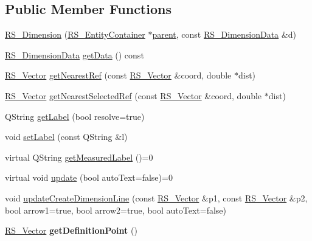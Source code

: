 \subsection*{Public Member Functions}
\begin{DoxyCompactItemize}
\item 
\hyperlink{classRS__Dimension_a2c6f8f5b67a071e52311daaa9a88af64}{R\-S\-\_\-\-Dimension} (\hyperlink{classRS__EntityContainer}{R\-S\-\_\-\-Entity\-Container} $\ast$\hyperlink{classRS__Entity_a80358a8d2fc6739a516a278dc500b49f}{parent}, const \hyperlink{classRS__DimensionData}{R\-S\-\_\-\-Dimension\-Data} \&d)
\item 
\hyperlink{classRS__DimensionData}{R\-S\-\_\-\-Dimension\-Data} \hyperlink{classRS__Dimension_ad8c1379f5581614b6fa2905434bc5859}{get\-Data} () const 
\item 
\hyperlink{classRS__Vector}{R\-S\-\_\-\-Vector} \hyperlink{classRS__Dimension_a85e687eb77484cf9ad27eaf7ab07254b}{get\-Nearest\-Ref} (const \hyperlink{classRS__Vector}{R\-S\-\_\-\-Vector} \&coord, double $\ast$dist)
\item 
\hyperlink{classRS__Vector}{R\-S\-\_\-\-Vector} \hyperlink{classRS__Dimension_a500b8585e0b651e693d9fd47bb86be19}{get\-Nearest\-Selected\-Ref} (const \hyperlink{classRS__Vector}{R\-S\-\_\-\-Vector} \&coord, double $\ast$dist)
\item 
Q\-String \hyperlink{classRS__Dimension_a87c6372241c3a25b83e41db5a55970f5}{get\-Label} (bool resolve=true)
\item 
void \hyperlink{classRS__Dimension_ae2ace5c182377eb10ed92273d00f6f56}{set\-Label} (const Q\-String \&l)
\item 
virtual Q\-String \hyperlink{classRS__Dimension_ad2da7da6e734c8c04bc7d858674d4653}{get\-Measured\-Label} ()=0
\item 
virtual void \hyperlink{classRS__Dimension_a67eeb2fe0f6a78c31db89ea7d92d4e1e}{update} (bool auto\-Text=false)=0
\item 
void \hyperlink{classRS__Dimension_ab6a1c4cab5ff0557dd708100f8d45ef9}{update\-Create\-Dimension\-Line} (const \hyperlink{classRS__Vector}{R\-S\-\_\-\-Vector} \&p1, const \hyperlink{classRS__Vector}{R\-S\-\_\-\-Vector} \&p2, bool arrow1=true, bool arrow2=true, bool auto\-Text=false)
\item 
\hypertarget{classRS__Dimension_a8793a2ab79bb4df618e0ca3ca3054e85}{\hyperlink{classRS__Vector}{R\-S\-\_\-\-Vector} {\bfseries get\-Definition\-Point} ()}\label{classRS__Dimension_a8793a2ab79bb4df618e0ca3ca3054e85}


\end{DoxyCompactItemize}
